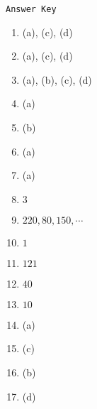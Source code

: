 \begin{center}
\texttt{Answer Key}
\begin{multicols}{5}
\begin{enumerate}
\item (a), (c), (d)
\item (a), (c), (d)
\item (a), (b), (c), (d)
\item (a)
\item (b)
\item (a)
\item (a)
\item $3$
\item $220, 80, 150, \cdots$
\item $1$
\item $121$
\item $40$
\item $10$
\item (a)
\item (c)
\item (b)
\item (d)
\end{enumerate}
\end{multicols}
\end{center}
